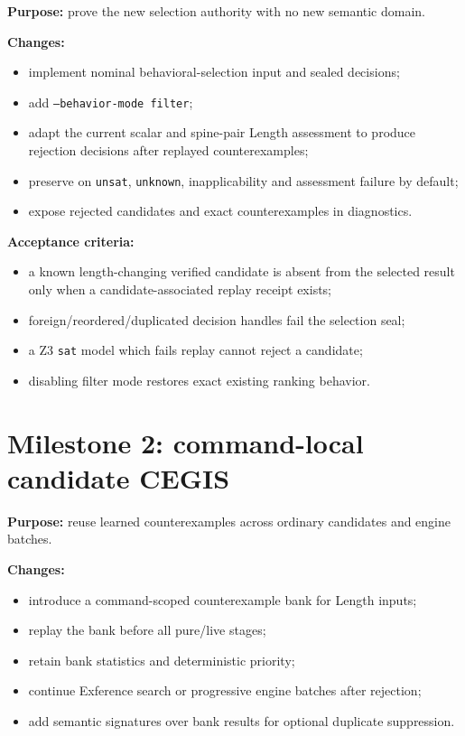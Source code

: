 \documentclass[11pt,oneside]{report}
\newcommand{\code}[1]{\texttt{#1}}
\begin{document}
\textbf{Purpose:} prove the new selection authority with no new semantic domain.

\textbf{Changes:}

\begin{itemize}[leftmargin=2em]
\item implement nominal behavioral-selection input and sealed decisions;
\item add \code{--behavior-mode filter};
\item adapt the current scalar and spine-pair Length assessment to produce rejection decisions after replayed counterexamples;
\item preserve on \texttt{unsat}, \texttt{unknown}, inapplicability and assessment failure by default;
\item expose rejected candidates and exact counterexamples in diagnostics.
\end{itemize}

\textbf{Acceptance criteria:}

\begin{itemize}[leftmargin=2em]
\item a known length-changing verified candidate is absent from the selected result only when a candidate-associated replay receipt exists;
\item foreign/reordered/duplicated decision handles fail the selection seal;
\item a Z3 \texttt{sat} model which fails replay cannot reject a candidate;
\item disabling filter mode restores exact existing ranking behavior.
\end{itemize}

\section{Milestone 2: command-local candidate CEGIS}

\textbf{Purpose:} reuse learned counterexamples across ordinary candidates and engine batches.

\textbf{Changes:}

\begin{itemize}[leftmargin=2em]
\item introduce a command-scoped counterexample bank for Length inputs;
\item replay the bank before all pure/live stages;
\item retain bank statistics and deterministic priority;
\item continue Exference search or progressive engine batches after rejection;
\item add semantic signatures over bank results for optional duplicate suppression.
\end{itemize}
\end{document}
